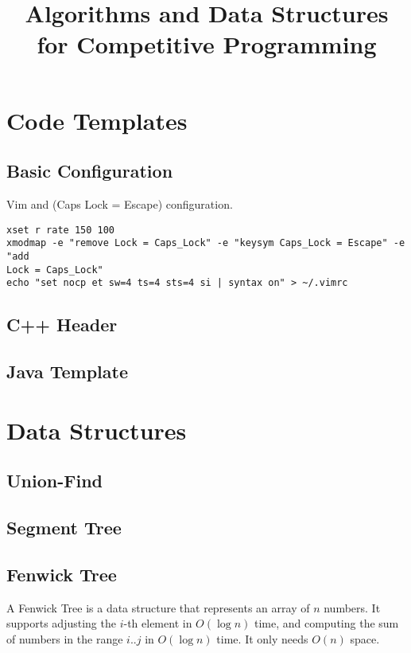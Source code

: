\documentclass[8pt,a4paper]{amsart}
\title{Algorithms and Data Structures for Competitive Programming}
\begin{document}
\maketitle
\tableofcontents
\newpage

\section{Code Templates}
\subsection{Basic Configuration}
Vim and (Caps Lock = Escape) configuration.
\begin{lstlisting}
xset r rate 150 100
xmodmap -e "remove Lock = Caps_Lock" -e "keysym Caps_Lock = Escape" -e "add
Lock = Caps_Lock"
echo "set nocp et sw=4 ts=4 sts=4 si | syntax on" > ~/.vimrc
\end{lstlisting}

\subsection{C++ Header}


\subsection{Java Template}


\section{Data Structures}

\subsection{Union-Find}



\subsection{Segment Tree}


\subsection{Fenwick Tree}
A Fenwick Tree is a data structure that represents an array of $n$ numbers. It
supports adjusting the $i$-th element in $O(\log n)$ time, and computing the
sum of numbers in the range $i..j$ in $O(\log n)$ time. It only needs $O(n)$
space.

\end{document}
